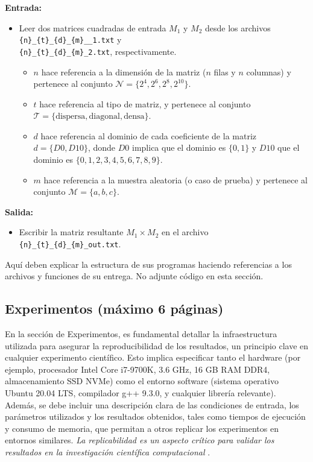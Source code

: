 \textbf{Entrada:}
\begin{itemize}
    \item Leer dos matrices cuadradas de entrada $M_1$ y $M_2$ desde los archivos \texttt{\{n\}\_\{t\}\_\{d\}\_\{m\}\_\_1.txt} y \\ 
    \texttt{\{n\}\_\{t\}\_\{d\}\_\{m\}\_2.txt}, respectivamente.
    \begin{itemize}
        \item $n$ hace referencia a la dimensión de la matriz ($n$ filas y $n$ columnas) y pertenece al conjunto $\mathcal{N} = \{2^4, 2^6, 2^8, 2^{10}\}$.
        \item $t$ hace referencia al tipo de matriz, y pertenece al conjunto $\mathcal{T} = \{ \text{dispersa}, \text{diagonal}, \text{densa} \}$.
        \item $d$ hace referencia al dominio de cada coeficiente de la matriz $d = \{D0, D10\}$, donde $D0$ implica que el dominio es $\{0,1\}$ y $D10$ que el dominio es $\{0,1,2,3,4,5,6,7,8,9\}$. 
        \item $m$ hace referencia a la muestra aleatoria (o caso de prueba) y pertenece al conjunto $\mathcal{M} = \{a,b,c\}$.
    \end{itemize}
\end{itemize}

\textbf{Salida:}
\begin{itemize}
    \item Escribir la matriz resultante $M_1 \times M_2$ en el archivo \texttt{\{n\}\_\{t\}\_\{d\}\_\{m\}\_out.txt}.
\end{itemize}

Aquí deben explicar la estructura de sus programas haciendo referencias a los archivos y funciones de su entrega. No adjunte código en esta sección.

\subsection{Experimentos (máximo 6 páginas)}


En la sección de Experimentos, es fundamental detallar la infraestructura utilizada para asegurar la reproducibilidad de los resultados, un principio clave en cualquier experimento científico. Esto implica especificar tanto el hardware (por ejemplo, procesador Intel Core i7-9700K, 3.6 GHz, 16 GB RAM DDR4, almacenamiento SSD NVMe) como el entorno software (sistema operativo Ubuntu 20.04 LTS, compilador g++ 9.3.0, y cualquier librería relevante). Además, se debe incluir una descripción clara de las condiciones de entrada, los parámetros utilizados y los resultados obtenidos, tales como tiempos de ejecución y consumo de memoria, que permitan a otros replicar los experimentos en entornos similares. \textit{La replicabilidad es un aspecto crítico para validar los resultados en la investigación científica computacional} \cite{inbookFonseca}.


